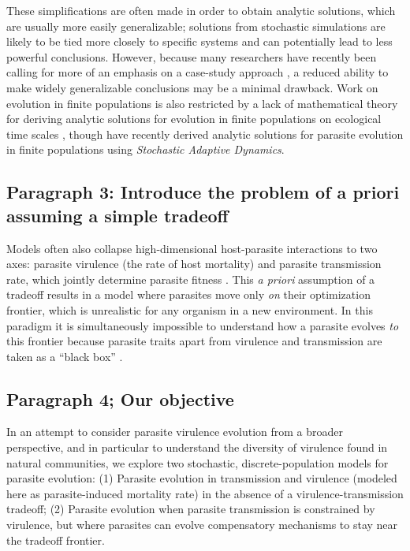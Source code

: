 These simplifications are often made in order to obtain analytic solutions, which are usually more easily generalizable; solutions from stochastic simulations are likely to be tied more closely to specific systems and can potentially lead to less powerful conclusions. However, because many researchers have recently been calling for more of an emphasis on a case-study approach \citep{BullandLauring2014, AlizonandMichalakis2015, Cressleretal.2016}, a reduced ability to make widely generalizable conclusions may be a minimal drawback. Work on evolution in finite populations is also restricted by a lack of mathematical theory for deriving analytic solutions for evolution in finite populations on ecological time scales \citep{Lion2018}, though \citet{Parsonsetal.2018} have recently derived analytic solutions for parasite evolution in finite populations using \emph{Stochastic Adaptive Dynamics}. 

\subsection*{Paragraph 3: Introduce the problem of a priori assuming a simple tradeoff}

Models often also collapse high-dimensional host-parasite interactions to two axes: parasite virulence (the rate of host mortality) and parasite transmission rate, which jointly determine parasite fitness \citep{AndersonandMay1982, Ewald1983, AlizonandMichalakis2015, Cressleretal.2016}. This \emph{a priori} assumption of a tradeoff results in a model where parasites move only \emph{on} their optimization frontier, which is unrealistic for any organism in a new environment. In this paradigm it is simultaneously 
impossible to understand how a parasite evolves \emph{to} this frontier because parasite traits apart from virulence and transmission are taken as a ``black box'' \citep{Alizonetal.2009, BullandLauring2014, AlizonandMichalakis2015}.

\subsection*{Paragraph 4; Our objective}

In an attempt to consider parasite virulence evolution from a broader perspective, and in particular to understand the diversity of virulence found in natural communities, we explore two stochastic, discrete-population models for parasite evolution: (1) Parasite evolution in transmission and virulence (modeled here as parasite-induced mortality rate) in the absence of a virulence-transmission tradeoff; (2) Parasite evolution when parasite transmission is constrained by virulence, but where parasites can evolve compensatory mechanisms to stay near the tradeoff frontier. 

